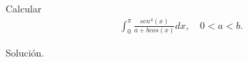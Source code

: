 \begin{homeworkProblem}
  Calcular
  \begin{align*}
    \int_{0}^{\pi}\frac{sen^4(x)}{a+bcos(x)}dx,\quad 0<a<b.
  \end{align*}
  \begin{solution}
    Solución. 
  \end{solution}
\end{homeworkProblem}
